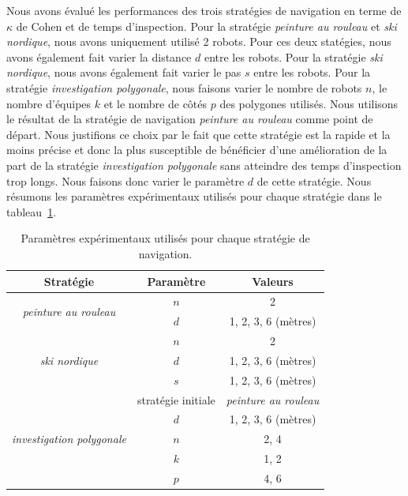 \documentclass[francais,RandD]{rapportPFE}
\begin{document}
		Nous avons évalué les performances des trois stratégies de navigation en terme de $\kappa$ de Cohen et de temps d'inspection.
		Pour la stratégie \textit{peinture au rouleau} et \textit{ski nordique}, nous avons uniquement utilisé 2 robots.
		Pour ces deux statégies, nous avons également fait varier la distance $d$ entre les robots.
		Pour la stratégie \textit{ski nordique}, nous avons également fait varier le pas $s$ entre les robots.
		Pour la stratégie \textit{investigation polygonale}, nous faisons varier le nombre de robots $n$, le nombre d'équipes $k$ et le nombre de côtés $p$ des polygones utilisés.
		Nous utilisons le résultat de la stratégie de navigation \textit{peinture au rouleau} comme point de départ.
		Nous justifions ce choix par le fait que cette stratégie est la rapide et la moins précise et donc la plus susceptible de bénéficier d'une amélioration de la part de la stratégie \textit{investigation polygonale} sans atteindre des temps d'inspection trop longs.
		Nous faisons donc varier le paramètre $d$ de cette stratégie.
		Nous résumons les paramètres expérimentaux utilisés pour chaque stratégie dans le tableau~\ref{tab:exp_params}.

		\begin{table}[h!]
			\centering
			\begin{tabular}{|c|c|c|}
				\hline
				Stratégie & Paramètre & Valeurs \\
				\hline
				\multirow{2}{*}{\textit{peinture au rouleau}} & $n$ & 2 \\
				& $d$ & 1, 2, 3, 6 (mètres) \\
				\hline
				\multirow{3}{*}{\textit{ski nordique}} & $n$ & 2 \\
				& $d$ & 1, 2, 3, 6 (mètres) \\
				& $s$ & 1, 2, 3, 6 (mètres) \\
				\hline
				\multirow{5}{*}{\textit{investigation polygonale}} & stratégie initiale & \textit{peinture au rouleau} \\
				& $d$ & 1, 2, 3, 6 (mètres) \\
				& $n$ & 2, 4 \\
				& $k$ & 1, 2 \\
				& $p$ & 4, 6 \\
				\hline
			\end{tabular}
			\caption{Paramètres expérimentaux utilisés pour chaque stratégie de navigation.}
			\label{tab:exp_params}
		\end{table}
\end{document}
